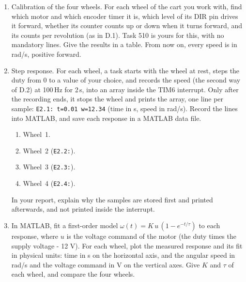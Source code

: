 \documentclass[11pt,a4paper]{article}
\begin{document}
\begin{enumerate}[label=E.\arabic*, leftmargin=2.2em]
  \item Calibration of the four wheels. For each wheel of the cart you work with, find which motor and which encoder
        timer it is, which level of its DIR pin drives it forward, whether its counter counts up or down when it
        turns forward, and its counts per revolution (as in D.1). Task 510 is yours for this, with no mandatory
        lines. Give the results in a table. From now on, every speed is in rad/s, positive forward.
  \item Step response. For each wheel, a task starts with the wheel at rest, steps the duty from 0 to a value of
        your choice, and records the speed (the second way of D.2) at 100\,Hz for 2\,s, into an array inside the
        TIM6 interrupt. Only after the recording ends, it stops the wheel and prints the array, one line per sample:
        \texttt{E2.1: t=0.01 w=12.34} (time in s, speed in rad/s). Record the lines into MATLAB, and save each
        response in a MATLAB data file.
        \begin{enumerate}[label=E.2.\arabic*, leftmargin=3.2em]
          \item Wheel~1.
          \item Wheel~2 (\texttt{E2.2:}).
          \item Wheel~3 (\texttt{E2.3:}).
          \item Wheel~4 (\texttt{E2.4:}).
        \end{enumerate}
        In your report, explain why the samples are stored first and printed afterwards, and not printed inside the
        interrupt.
  \item In MATLAB, fit a first-order model $\omega(t) = K\,u\,(1 - e^{-t/\tau})$ to each response, where $u$ is the
        voltage command of the motor (the duty times the supply voltage - 12 V). For each
        wheel, plot the measured response and its fit in physical units: time in s on the horizontal axis, and the
        angular speed in rad/s and the voltage command in V on the vertical axes. Give $K$ and $\tau$ of each wheel,
        and compare the four wheels.
\end{enumerate}
\end{document}
